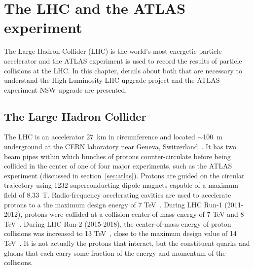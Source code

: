 
\chapter{The LHC and the ATLAS experiment}
\label{chap:lhc_atlas}

The Large Hadron Collider (LHC) is the world's most energetic particle accelerator and the ATLAS experiment is used to record the results of particle collisions at the LHC. In this chapter, details about both that are necessary to understand the High-Luminosity LHC upgrade project and the ATLAS experiment NSW upgrade are presented.

\section{The Large Hadron Collider}

The LHC is an accelerator \SI{27}{\kilo\meter} in circumference and located $\sim$\SI{100}{\meter} underground at the CERN laboratory near Geneva, Switzerland~\cite{evans_lhc_2008}. It has two beam pipes within which bunches of protons counter-circulate before being collided in the center of one of four major experiments, such as the ATLAS experiment (discussed in section~\ref{sec:atlas}). Protons are guided on the circular trajectory using 1232 superconducting dipole magnets capable of a maximum field of \SI{8.33}{T}. Radio-frequency accelerating cavities are used to accelerate protons to a the maximum design energy of 7 TeV~\cite{bruning_lhc_2004}.  During LHC Run-1 (2011-2012), protons were collided at a collision center-of-mass energy of 7 TeV and 8 TeV~\cite{atlas_luminosity_run1}. During LHC Run-2 (2015-2018), the center-of-mass energy of proton collisions was increased to 13 TeV~\cite{atlas_luminosity_run2}, close to the maximum design value of 14 TeV~\cite{bruning_lhc_2004}. It is not actually the protons that interact, but the constituent quarks and gluons that each carry some fraction of the energy and momentum of the collisions.


